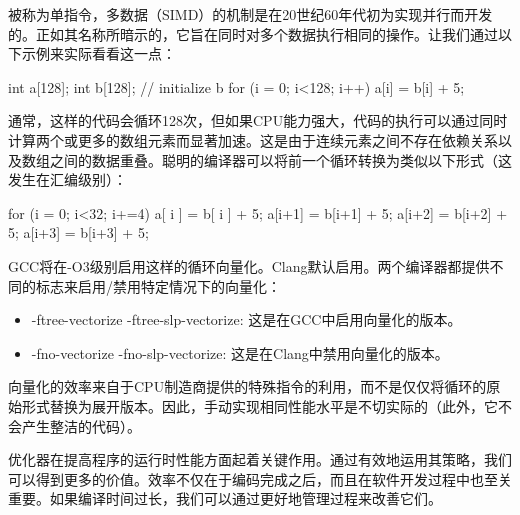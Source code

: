 
被称为单指令，多数据（SIMD）的机制是在20世纪60年代初为实现并行而开发的。正如其名称所暗示的，它旨在同时对多个数据执行相同的操作。让我们通过以下示例来实际看看这一点：

\begin{cpp}
int a[128];
int b[128];
// initialize b
for (i = 0; i<128; i++)
    a[i] = b[i] + 5;
\end{cpp}

通常，这样的代码会循环128次，但如果CPU能力强大，代码的执行可以通过同时计算两个或更多的数组元素而显著加速。这是由于连续元素之间不存在依赖关系以及数组之间的数据重叠。聪明的编译器可以将前一个循环转换为类似以下形式（这发生在汇编级别）：

\begin{cpp}
for (i = 0; i<32; i+=4) {
    a[ i ] = b[ i ] + 5;
    a[i+1] = b[i+1] + 5;
    a[i+2] = b[i+2] + 5;
    a[i+3] = b[i+3] + 5;
}
\end{cpp}

GCC将在-O3级别启用这样的循环向量化。Clang默认启用。两个编译器都提供不同的标志来启用/禁用特定情况下的向量化：

\begin{itemize}
\item
-ftree-vectorize -ftree-slp-vectorize: 这是在GCC中启用向量化的版本。

\item
-fno-vectorize -fno-slp-vectorize: 这是在Clang中禁用向量化的版本。
\end{itemize}

向量化的效率来自于CPU制造商提供的特殊指令的利用，而不是仅仅将循环的原始形式替换为展开版本。因此，手动实现相同性能水平是不切实际的（此外，它不会产生整洁的代码）。

优化器在提高程序的运行时性能方面起着关键作用。通过有效地运用其策略，我们可以得到更多的价值。效率不仅在于编码完成之后，而且在软件开发过程中也至关重要。如果编译时间过长，我们可以通过更好地管理过程来改善它们。














